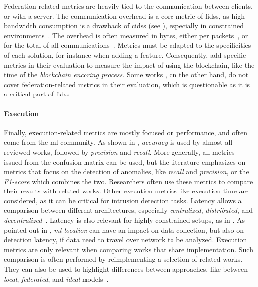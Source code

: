 Federation-related metrics are heavily tied to the communication between clients, or with a server.
The communication overhead is a core metric of \glspl{fids}, as high bandwidth consumption is a drawback of \glspl{cids} (see ), especially in constrained environments~\cite{qin_LineSpeedScalableIntrusion_2020a}.
The overhead is often measured in bytes, either per packets~\cite{pahl_AllEyesYou_2018}, or for the total of all communications~\cite{schneble_Attackdetectionusing_2019,zhang_BlockchainbasedFederatedLearning_2020}.
Metrics must be adapted to the specificities of each solution, for instance when adding a feature.
Consequently, \textcite{zhang_BlockchainbasedFederatedLearning_2020} add specific metrics in their evaluation to measure the impact of using the blockchain, like the time of the \emph{blockchain encoring process}.
Some works \cite{rathore_BlockSecIoTNetBlockchainbaseddecentralized_2019,li_DeepFedFederatedDeep_2020,chen_Networkanomalydetection_2020,fan_IoTDefenderFederatedTransfer_2020,rahman_InternetThingsIntrusion_2020,al-athbaal-marri_FederatedMimicLearning_2020,popoola_FederatedDeepLearning_2021a,sun_IntrusionDetectionSegmented_2020}, on the other hand, do not cover federation-related metrics in their evaluation, which is questionable as it is a critical part of \glspl{fids}.

\paragraph{Execution}

Finally, execution-related metrics are mostly focused on performance, and often come from the \gls{ml} community.
As shown in , \emph{accuracy} is used by almost all reviewed works, followed by \emph{precision} and \emph{recall}.
More generally, all metrics issued from the confusion matrix can be used, but the literature emphasizes on metrics that focus on the detection of anomalies, like \emph{recall} and \emph{precision}, or the \emph{F1-score} which combines the two.
Researchers often use these metrics to compare their results with related works.
Other execution metrics like execution time are considered, as it can be critical for intrusion detection tasks.
Latency allows a comparison between different architectures, especially \emph{centralized}, \emph{distributed}, and \emph{decentralized}~\cite{rathore_BlockSecIoTNetBlockchainbaseddecentralized_2019}.
Latency is also relevant for highly constrained setups, as in \cite{qin_LineSpeedScalableIntrusion_2020a}.
As pointed out in , \emph{\gls{ml} location} can have an impact on data collection, but also on detection latency, if data need to travel over network to be analyzed.
Execution metrics are only relevant when comparing works that share implementation.
Such comparison is often performed by reimplementing a selection of related works.
They can also be used to highlight differences between approaches, like between \emph{local}, \emph{federated}, and \emph{ideal} models~\cite{li_DeepFedFederatedDeep_2020,rathore_BlockSecIoTNetBlockchainbaseddecentralized_2019}.